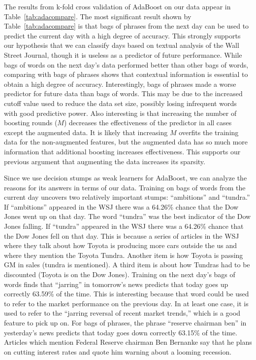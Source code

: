 \documentclass[10pt, twocolumn]{article}
\begin{document}
The results from k-fold cross validation of AdaBoost on our data appear in Table~\ref{tab:adacompare}. The most significant result shown by Table~\ref{tab:adacompare} is that bags of phrases from the next day can be used to predict the current day with a high degree of accuracy. This strongly supports our hypothesis that we can classify days based on textual analysis of the Wall Street Journal, though it is useless as a predictor of future performance. While bags of words on the next day's data performed better than other bags of words, comparing with bags of phrases shows that contextual information is essential to obtain a high degree of accuracy. Interestingly, bags of phrases made a worse predictor for future data than bags of words. This may be due to the increased cutoff value used to reduce the data set size, possibly losing infrequent words with good predictive power. Also interesting is that increasing the number of boosting rounds ($M$) decreases the effectiveness of the predictor in all cases except the augmented data. It is likely that increasing $M$ overfits the training data for the non-augmented features, but the augmented data has so much more information that additional boosting increases effectiveness. This supports our previous argument that augmenting the data increases its sparsity.

Since we use decision stumps as weak learners for AdaBoost, we can analyze the reasons for its answers in terms of our data. Training on bags of words from the current day uncovers two relatively important stumps: ``ambitions'' and ``tundra.'' If ``ambitions'' appeared in the WSJ there was a 64.26\% chance that the Dow Jones went up on that day.  The word ``tundra'' was the best indicator of the Dow Jones falling. If ``tundra'' appeared in the WSJ there was a 64.26\% chance that the Dow Jones fell on that day. This is because a series of articles in the WSJ where they talk about how Toyota is producing more cars outside the us and where they mention the Toyota Tundra. Another item is how Toyota is passing GM in sales (tundra is mentioned). A third item is about how Tundras had to be discounted (Toyota is on the Dow Jones). Training on the next day's bags of words finds that ``jarring'' in tomorrow's news predicts that today goes up correctly 63.59\% of the time. This is interesting because that word could be used to refer to the market performance on the previous day. In at least one case, it is used to refer to the ``jarring reversal of recent market trends,'' which is a good feature to pick up on. For bags of phrases, the phrase ``reserve chairman ben'' in yesterday's news predicts that today goes down correctly 63.15\% of the time. Articles which mention Federal Reserve chairman Ben Bernanke say that he plans on cutting interest rates and quote him warning about a looming recession.
\end{document}
